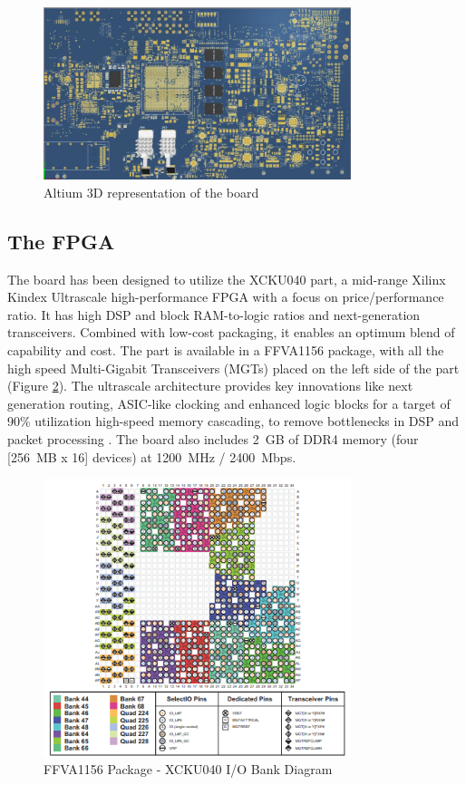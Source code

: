 \documentclass[a4paper]{PoS}
\begin{document}
\begin{figure}[h]
\centering
\includegraphics[width=0.8\textwidth]{board_3D_altium.png}
\caption{Altium 3D representation of the board}
\label{fig1}
\end{figure}



\subsection{The FPGA}
The board has been designed to utilize the XCKU040 part, a  mid-range Xilinx Kindex Ultrascale high-performance FPGA with a focus on price/performance ratio. It has high DSP and block RAM-to-logic ratios and next-generation transceivers. Combined with low-cost packaging, it enables an optimum blend of capability and cost. The part is available in a FFVA1156 package, with all the high speed Multi-Gigabit Transceivers (MGTs)  placed on the left side of the part (Figure \ref{xcku040}). The ultrascale architecture provides key innovations like next generation routing, ASIC-like clocking and enhanced logic blocks for a target of 90\% utilization high-speed memory cascading, to remove bottlenecks in DSP and packet processing \cite{mehta2013xilinx}.
The board also includes 2~GB of DDR4 memory (four [256~MB x 16] devices) at 1200~MHz / 2400~Mbps.

\begin{figure}[h]
\centering
\includegraphics[width=0.8\textwidth]{xcku040_pinout.png}
\caption{FFVA1156 Package - XCKU040 I/O Bank Diagram}
\label{xcku040}
\end{figure}
\end{document}
